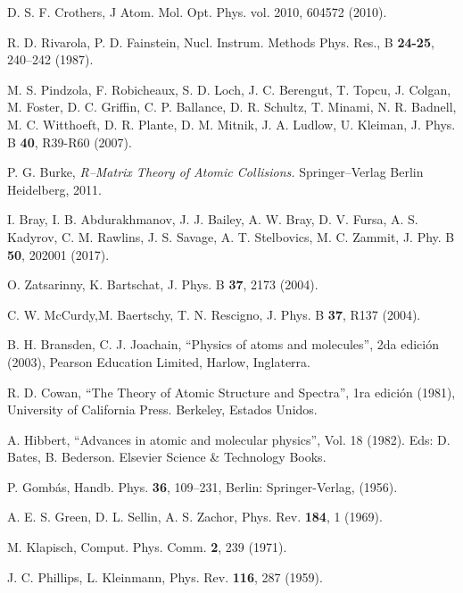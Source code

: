 \begin{thebibliography}{9}
D. S. F. Crothers,
J Atom. Mol. Opt. Phys. vol. 2010, 604572 (2010).

R. D. Rivarola, P. D. Fainstein,
Nucl. Instrum. Methods Phys. Res., B \textbf{24-25}, 240--242 (1987).

M. S. Pindzola, F. Robicheaux, S. D. Loch, J. C. Berengut, T. Topcu, 
J. Colgan, M. Foster, D. C. Griffin, C. P. Ballance, D. R. Schultz,
T. Minami, N. R. Badnell, M. C. Witthoeft, D. R. Plante, D. M. Mitnik, 
J. A. Ludlow, U. Kleiman, 
J. Phys. B \textbf{40}, R39-R60 (2007).

P. G. Burke, 
\textit{R--Matrix Theory of Atomic Collisions.}
Springer--Verlag Berlin Heidelberg, 2011.

I. Bray, I. B. Abdurakhmanov, J. J. Bailey, A. W. Bray, D. V. Fursa,
A. S. Kadyrov, C. M. Rawlins, J. S. Savage, A. T. Stelbovics, M. C. Zammit,
J. Phy. B \textbf{50}, 202001 (2017).

O. Zatsarinny, K. Bartschat,
J. Phys. B \textbf{37}, 2173 (2004).

C. W. McCurdy,M.  Baertschy, T. N. Rescigno,
J. Phys. B \textbf{37}, R137 (2004).

B. H. Bransden, C. J. Joachain,
``Physics of atoms and molecules'', 2da edición (2003),
Pearson Education Limited, Harlow, Inglaterra.

R. D. Cowan,
``The Theory of Atomic Structure and Spectra'', 1ra edición (1981),
University of California Press. Berkeley, Estados Unidos.


A. Hibbert,
``Advances in atomic and molecular physics'', Vol. 18 (1982).
Eds: D. Bates, B. Bederson. Elsevier Science \& Technology Books.

P. Gombás, 
Handb. Phys. \textbf{36}, 109--231, Berlin: Springer-Verlag, (1956).

A. E. S. Green, D. L. Sellin, A. S. Zachor,
Phys. Rev. \textbf{184}, 1 (1969).

M. Klapisch,
Comput. Phys. Comm. \textbf{2}, 239 (1971).

J. C. Phillips, L. Kleinmann,
Phys. Rev. \textbf{116}, 287 (1959).


\end{thebibliography}
